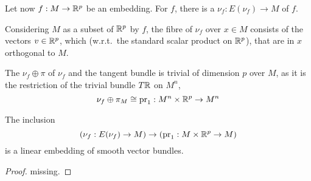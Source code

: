\documentclass[a4paper]{article}
\begin{document}
\begin{definition}
  Let now $f:M\to\mathbb{R}^p$ be an embedding. For $f$, there is a  $\nu_f:E(\nu_f)\to M$ of $f$.
\end{definition}\cite[p.2]{brocker}

Considering $M$ as a subset of $\mathbb{R}^p$ by $f$, the fibre of $\nu_f$ over $x\in M$ consists of the vectors $v\in\mathbb{R}^p$, which (w.r.t.\ the standard scalar product on $\mathbb{R}^p$), that are in $x$ orthogonal to $M$.


The  $\nu_f\oplus\pi$ of $\nu_f$ and the tangent bundle is trivial of dimension $p$ over $M$, as it is the restriction of the trivial bundle $T\mathbb{R}$ on $M^n$, 
\[\nu_f\oplus\pi_M\cong\mathrm{pr}_1:M^n\times\mathbb{R}^p\to M^n\]

\begin{theorem}
  The inclusion
  \[(\nu_f:E(\nu_f)\to M)\to(\mathrm{pr}_1:M\times\mathbb{R}^p\to M)\]
  is a linear embedding of smooth vector bundles.
\end{theorem}\cite[p.2]{brocker}

\begin{proof}
  missing.
\end{proof}


\newpage\printbibliography%
\end{document}
